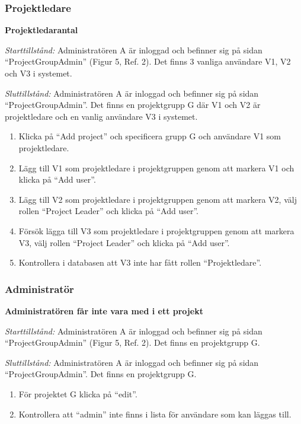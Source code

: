 \documentclass[a4paper]{article}
\begin{document}
\subsubsection{Projektledare}
\begin{FT}
\item \textbf{Projektledarantal}

\emph{Starttillstånd:} Administratören A är inloggad och befinner sig på sidan ``ProjectGroupAdmin'' (Figur 5, Ref. 2). Det finns 3 vanliga användare V1, V2 och V3 i systemet.

\emph{Sluttillstånd:} Administratören A är inloggad och befinner sig på sidan ``ProjectGroupAdmin''. Det finns en projektgrupp G där V1 och V2 är projektledare och en vanlig användare V3 i systemet.

\begin{enumerate}
\item Klicka på ``Add project'' och specificera grupp G och användare V1 som projektledare.
\item Lägg till V1 som projektledare i projektgruppen genom att markera V1 och klicka på ``Add user''.
\item Lägg till V2 som projektledare i projektgruppen genom att markera V2, välj rollen ``Project Leader'' och klicka på ``Add user''.
\item Försök lägga till V3 som projektledare i projektgruppen genom att markera V3, välj rollen ``Project Leader'' och klicka på ``Add user''.
\item Kontrollera i databasen att V3 inte har fått rollen ``Projektledare''.
\end{enumerate}

\end{FT}

\subsubsection{Administratör}
\begin{FT}
\item \textbf{Administratören får inte vara med i ett projekt}

\emph{Starttillstånd:} Administratören A är inloggad och befinner sig på sidan ``ProjectGroupAdmin'' (Figur 5, Ref. 2). Det finns en projektgrupp G.

\emph{Sluttillstånd:} Administratören A är inloggad och befinner sig på sidan ``ProjectGroupAdmin''. Det finns en projektgrupp G.

\begin{enumerate}
\item För projektet G klicka på ``edit''.
\item Kontrollera att ``admin'' inte finns i lista för användare som kan läggas till.
\end{enumerate}
\end{FT}
\end{document}
